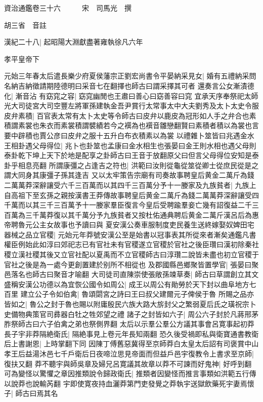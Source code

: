 資治通鑑卷三十六　　　宋　司馬光　撰

胡三省　音註

漢紀二十八|{
	起昭陽大淵獻盡著雍執徐凡六年}


孝平皇帝下

元始三年春太后遣長樂少府夏侯藩宗正劉宏尚書令平晏納采見女|{
	婚有五禮納采問名納吉納徵請期陸德明曰采音七在翻擇也師古曰謂采擇其可者}
還奏言公女漸漬德化|{
	漸音沾}
有窈窕之容|{
	窈窕幽閒也王肅曰善心曰窈善容曰窕}
宜承天序奉祭祀太師光大司徒宮大司空豐左將軍孫建執金吾尹賞行太常事太中大夫劉秀及太卜太史令服皮弁素積|{
	百官表太常有太卜太史等令師古曰皮弁以鹿皮為冠形如人手之弁合也素積謂素裳也朱衣而素裳積謂襞績若今之襈為也襈音雛戀翻賢曰素積者積以為裳也言要中辟積也賈公彦曰皮弁之服十五升白布衣積素以為裳}
以禮雜卜筮皆曰兆遇金水王相卦遇父母得位|{
	兆卜也卦筮也孟康曰金水相生也張晏曰金王則水相也遇父母則泰卦乾下坤上天下於地是配享之卦師古曰王音于放翻原父曰但言父母得位安知是泰卦乎相息亮翻}
所謂康彊之占逢吉之符也|{
	洪範曰汝則從龜從筮從卿士從庶民從是之謂大同身其康彊子孫其逢吉}
又以太牢策告宗廟有司奏故事聘皇后黄金二萬斤為錢二萬萬莽深辭讓受六千三百萬而以其四千三百萬分予十一媵家及九族貧者|{
	九族上自高祖下至玄孫之親按漢書王莽傳故事聘皇后黄金二萬斤為錢二萬萬莽深辭讓受四千萬而以其三千三百萬予十一媵家羣臣復言今皇后受聘踰羣妾亡幾有詔復益二千三百萬為三千萬莽復以其千萬分予九族貧者又按杜佑通典聘后黄金二萬斤漢呂后為惠帝聘魯元公主女故事也予讀曰與}
夏安漢公奏車服制度吏民養生送終嫁娶奴婢田宅器械之品立官稷|{
	元始元年莽號安漢公至是始書以冠事表其所從來者漸矣通鑑凡書權臣例始此如淳曰郊祀志已有官社未有官稷遂立官稷於官社之後臣瓚曰漢初除秦社稷立漢社稷其後又立官社配以夏禹而不立官稷師古曰淳瓚二說皆未盡也初立官稷于官社之後是為一處今更創置建於别所不相從也}
及郡國縣邑鄉聚皆置學官|{
	張晏曰聚邑落名也師古曰聚音才喻翻}
大司徒司直陳崇使張敞孫竦草奏|{
	師古曰草謂創立其文}
盛稱安漢公功德以為宜恢公國令如周公|{
	成王以周公有勛勞於天下封以曲阜地方七百里}
建立公子令如伯禽|{
	魯頌閟宮之詩曰王曰叔父建爾元子俾侯于魯}
所賜之品亦皆如之|{
	魯公之封于魯也賜以附庸殷民六族大路大旂封父之繁弱夏后氏之璜祝宗卜史備物典策官司彞器白牡之牲郊望之禮}
諸子之封皆如六子|{
	周公六子封於凡蔣邢茅胙祭師古曰六子伯禽之弟也祭側界翻}
太后以示羣公羣公方議其事會呂寛事起初莽長子宇非莽隔絶衛氏|{
	隔絶事見上卷元年長知兩翻}
恐久後受禍即私與衛寶通書教衛后上書謝恩|{
	上時掌翻下同}
因陳丁傅舊惡冀得至京師莽白太皇太后詔有司褒賞中山孝王后益湯沐邑七千戶衛后日夜啼泣思見帝面而但益戶邑宇復教令上書求至京師|{
	復扶又翻}
莽不聽宇與師吳章及婦兄呂寛議其故章以莽不可諫而好鬼神|{
	好呼到翻}
可為變怪以驚懼之章因推類說令歸政衛氏|{
	推類者因變怪而推言事類如洪範五行傳以說莽也說輸芮翻}
宇即使寛夜持血灑莽第門吏發覺之莽執宇送獄飲藥死宇妻焉懷子|{
	師古曰焉其名}
